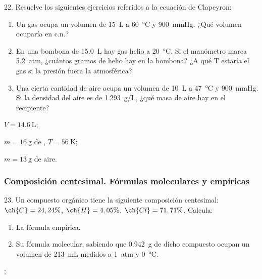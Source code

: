 \documentclass[10pt]{article}
\begin{document}
\begin{multicols}{2}
\begin{exercise}
  22. Resuelve los siguientes ejercicios referidos a la ecuación de Clapeyron:
  \begin{enumerate}
    \item Un gas ocupa un volumen de \SI{15}{\liter} a \SI{60}{\celsius} y \SI{900}{\mmHg}. ¿Qué volumen ocuparía en c.n.?
    \item En una bombona de \SI{15.0}{\liter} hay gas helio a \SI{20}{\celsius}. Si el manómetro marca \SI{5.2}{atm}, ¿cuántos gramos de helio hay en la bombona? ¿A qué T estaría el gas si la presión fuera la atmosférica?
    \item Una cierta cantidad de aire ocupa un volumen de \SI{10}{\liter} a \SI{47}{\celsius} y \SI{900}{\mmHg}. Si la densidad del aire es de \SI{1.293}{g/L}, ¿qué masa de aire hay en el recipiente?
  \end{enumerate}
\end{exercise}
\begin{solution}
  \begin{enumerate*}
    \item $V = \SI{14.6}{\liter}$; \item $m = \SI{16}{\gram}$ de , $T = \SI{56}{\kelvin}$; \item $m = \SI{13}{\gram}$ de aire.
  \end{enumerate*}
\end{solution}





\subsubsection{Composición centesimal. Fórmulas moleculares y empíricas}

\begin{exercise}
  23. Un compuesto orgánico tiene la siguiente composición centesimal: $\ch{C} = 24,24\%$, $\ch{H} = 4,05\%$, $\ch{Cl} = 71,71\%$. Calcula: %
  \begin{enumerate}
    \item La fórmula empírica.
    \item Su fórmula molecular, sabiendo que \SI{0.942}{\gram} de dicho compuesto ocupan un volumen de \SI{213}{\milli\liter} medidos a \SI{1}{atm} y \SI{0}{\celsius}.
  \end{enumerate}
\end{exercise}
\begin{solution}
  \begin{enumerate*}
    \item {};
    \item {}
  \end{enumerate*}


\end{solution}
\end{multicols}
\end{document}
